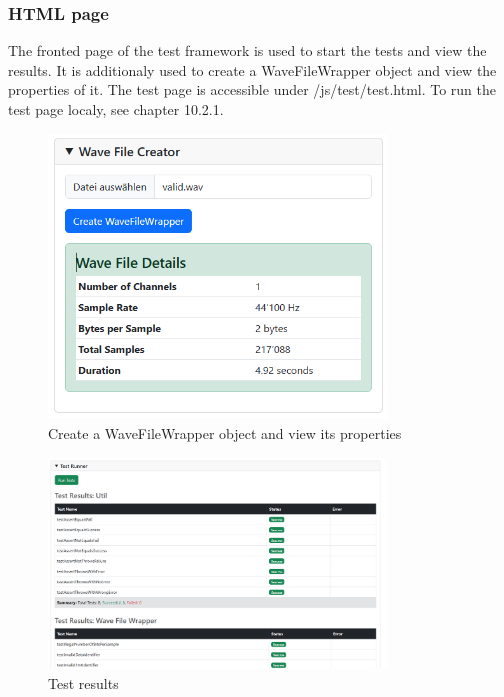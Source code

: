 \subsubsection{HTML page}
The fronted page of the test framework is used to start the tests and view the results. It is additionaly used to create a WaveFileWrapper object and view the properties of it. The test page is accessible under /js/test/test.html. To run the test page localy, see chapter 10.2.1. 

\begin{figure}[H]
    \centering
    \includegraphics[width=0.8\textwidth]{../assets/wavefilecreator.png}
    \caption{Create a WaveFileWrapper object and view its properties}
\end{figure}

\begin{figure}[H]
    \centering
    \includegraphics[width=0.8\textwidth]{../assets/test_results.png}
    \caption{Test results}
\end{figure}

